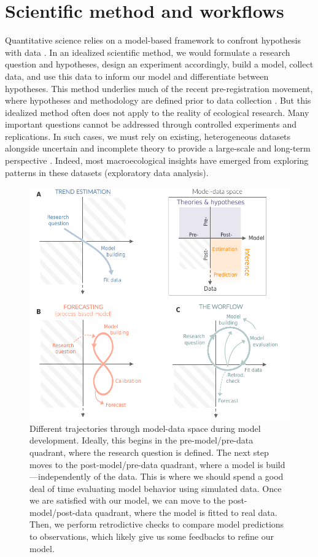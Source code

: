 \documentclass[11pt]{article}
\begin{document}
\section{Scientific method and workflows}

Quantitative science relies on a model-based framework to confront hypothesis with data \citep{Chamberlin:1965cd}. In an idealized scientific method, we would formulate a research question and hypotheses, design an experiment accordingly, build a model, collect data, and use this data to inform our model and differentiate between hypotheses. This method underlies much of the recent pre-registration movement, where hypotheses and methodology are defined prior to data collection \citep{Nosek2018}.
But this idealized method often does not apply to the reality of ecological research. Many important questions cannot be addressed through controlled experiments and replications. In such cases, we must rely on existing, heterogeneous datasets alongside uncertain and incomplete theory to provide a large-scale and long-term perspective \citep{Hilborn1997}. Indeed, most macroecological insights have emerged from exploring patterns in these datasets (exploratory data analysis).

\begin{figure}[h]
	\centering
	\includegraphics{figures/modeldataspaces_rotation}
	\caption{Different trajectories through model-data space during model development. Ideally, this begins in the pre-model/pre-data quadrant, where the research question is defined. The next step moves to the post-model/pre-data quadrant, where a model is build---independently of the data. This is where we should spend a good deal of time evaluating model behavior using simulated data. Once we are satisfied with our model, we can move to the post-model/post-data quadrant, where the model is fitted to real data. Then, we perform retrodictive checks to compare model predictions to observations, which likely give us some feedbacks to refine our model.}
	\label{fig:modeldata}
\end{figure}
\end{document}
